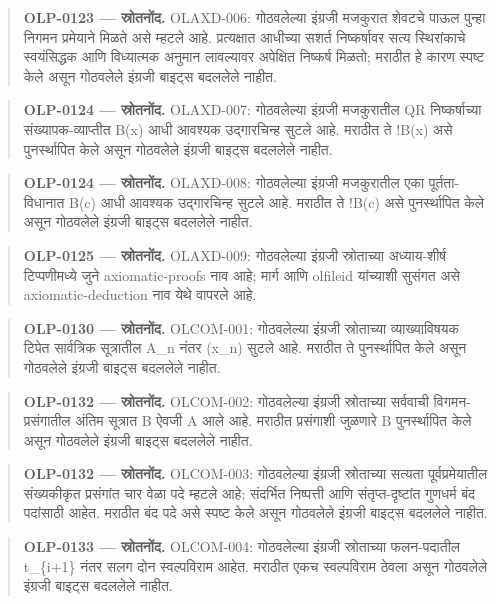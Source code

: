 \begin{quote}\small\textbf{OLP-0123 — स्रोतनोंद.} OLAXD-006: गोठवलेल्या इंग्रजी मजकुरात शेवटचे पाऊल पुन्हा निगमन प्रमेयाने मिळते असे म्हटले आहे. प्रत्यक्षात आधीच्या सशर्त निष्कर्षावर सत्य स्थिरांकाचे स्वयंसिद्धक आणि विध्यात्मक अनुमान लावल्यावर अपेक्षित निष्कर्ष मिळतो; मराठीत हे कारण स्पष्ट केले असून गोठवलेले इंग्रजी बाइट्स बदललेले नाहीत.\end{quote}
\begin{quote}\small\textbf{OLP-0124 — स्रोतनोंद.} OLAXD-007: गोठवलेल्या इंग्रजी मजकुरातील QR निष्कर्षाच्या संख्यापक-व्याप्तीत B(x) आधी आवश्यक उद्गारचिन्ह सुटले आहे. मराठीत ते {!}B(x) असे पुनर्स्थापित केले असून गोठवलेले इंग्रजी बाइट्स बदललेले नाहीत.\end{quote}
\begin{quote}\small\textbf{OLP-0124 — स्रोतनोंद.} OLAXD-008: गोठवलेल्या इंग्रजी मजकुरातील एका पूर्तता-विधानात B(c) आधी आवश्यक उद्गारचिन्ह सुटले आहे. मराठीत ते {!}B(c) असे पुनर्स्थापित केले असून गोठवलेले इंग्रजी बाइट्स बदललेले नाहीत.\end{quote}
\begin{quote}\small\textbf{OLP-0125 — स्रोतनोंद.} OLAXD-009: गोठवलेल्या इंग्रजी स्रोताच्या अध्याय-शीर्ष टिप्पणीमध्ये जुने axiomatic-proofs नाव आहे; मार्ग आणि olfileid यांच्याशी सुसंगत असे axiomatic-deduction नाव येथे वापरले आहे.\end{quote}
\begin{quote}\small\textbf{OLP-0130 — स्रोतनोंद.} OLCOM-001: गोठवलेल्या इंग्रजी स्रोताच्या व्याख्याविषयक टिपेत सार्वत्रिक सूत्रातील A\_n नंतर (x\_n) सुटले आहे. मराठीत ते पुनर्स्थापित केले असून गोठवलेले इंग्रजी बाइट्स बदललेले नाहीत.\end{quote}
\begin{quote}\small\textbf{OLP-0132 — स्रोतनोंद.} OLCOM-002: गोठवलेल्या इंग्रजी स्रोताच्या सर्ववाची विगमन-प्रसंगातील अंतिम सूत्रात B ऐवजी A आले आहे. मराठीत प्रसंगाशी जुळणारे B पुनर्स्थापित केले असून गोठवलेले इंग्रजी बाइट्स बदललेले नाहीत.\end{quote}
\begin{quote}\small\textbf{OLP-0132 — स्रोतनोंद.} OLCOM-003: गोठवलेल्या इंग्रजी स्रोताच्या सत्यता पूर्वप्रमेयातील संख्यकीकृत प्रसंगांत चार वेळा पदे म्हटले आहे; संदर्भित निष्पत्ती आणि संतृप्त-दृष्टांत गुणधर्म बंद पदांसाठी आहेत. मराठीत बंद पदे असे स्पष्ट केले असून गोठवलेले इंग्रजी बाइट्स बदललेले नाहीत.\end{quote}
\begin{quote}\small\textbf{OLP-0133 — स्रोतनोंद.} OLCOM-004: गोठवलेल्या इंग्रजी स्रोताच्या फलन-पदातील t\_\{i+1\} नंतर सलग दोन स्वल्पविराम आहेत. मराठीत एकच स्वल्पविराम ठेवला असून गोठवलेले इंग्रजी बाइट्स बदललेले नाहीत.\end{quote}
